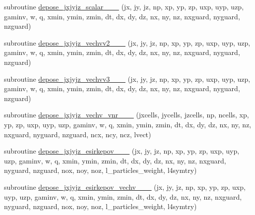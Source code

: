 \begin{DoxyCompactItemize}
subroutine \hyperlink{current__deposition_8_f90_a9b0dd01b38cde503f1aac44bb2bd1ca8}{depose\+\_\+jxjyjz\+\_\+scalar\+\_\+\_\+\_} (jx, jy, jz, np, xp, yp, zp, uxp, uyp, uzp, gaminv, w, q, xmin, ymin, zmin,                                       dt, dx, dy, dz, nx, ny, nz, nxguard, nyguard, nzguard)
\item 
subroutine \hyperlink{current__deposition_8_f90_a36572b29ee3f03dd598f10e2268204f0}{depose\+\_\+jxjyjz\+\_\+vechvv2\+\_\+\_\+\_} (jx, jy, jz, np, xp, yp, zp, uxp, uyp, uzp, gaminv, w, q, xmin, ymin, zmin,                                       dt, dx, dy, dz, nx, ny, nz, nxguard, nyguard, nzguard)
\item 
subroutine \hyperlink{current__deposition_8_f90_a4b4bb06ef5eb6ca6e28d2c24472fb216}{depose\+\_\+jxjyjz\+\_\+vechvv3\+\_\+\_\+\_} (jx, jy, jz, np, xp, yp, zp, uxp, uyp, uzp, gaminv, w, q, xmin, ymin, zmin,                                       dt, dx, dy, dz, nx, ny, nz, nxguard, nyguard, nzguard)
\item 
subroutine \hyperlink{current__deposition_8_f90_a95bde392441e1836c282cd5b53c6e5c1}{depose\+\_\+jxjyjz\+\_\+vechv\+\_\+vnr\+\_\+\_\+\_} (jxcells, jycells, jzcells, np, ncells, xp, yp, zp,                                   uxp, uyp, uzp, gaminv, w, q, xmin, ymin, zmin,                                       dt, dx, dy, dz, nx, ny, nz, nxguard, nyguard, nzguard, ncx, ncy, ncz, lvect)
\item 
subroutine \hyperlink{current__deposition_8_f90_ad43ded0ebf597e9d3cb47ff84ec04413}{depose\+\_\+jxjyjz\+\_\+esirkepov\+\_\+\_\+\_} (jx, jy, jz, np, xp, yp, zp, uxp, uyp, uzp, gaminv, w, q, xmin, ymin, zmin,                                                                                                                                                   dt, dx, dy, dz, nx, ny, nz, nxguard, nyguard, nzguard,                                                                                                                                                   nox, noy, noz, l\+\_\+particles\+\_\+weight, l4symtry)
\item 
subroutine \hyperlink{current__deposition_8_f90_a29f972e9b6064aee31d065c4f54aa184}{depose\+\_\+jxjyjz\+\_\+esirkepov\+\_\+vechv\+\_\+\_\+\_} (jx, jy, jz, np, xp, yp, zp, uxp, uyp, uzp, gaminv, w, q, xmin, ymin, zmin,                                                                                                                                                   dt, dx, dy, dz, nx, ny, nz, nxguard, nyguard, nzguard,                                                                                                                                                   nox, noy, noz, l\+\_\+particles\+\_\+weight, l4symtry)

\end{DoxyCompactItemize}
